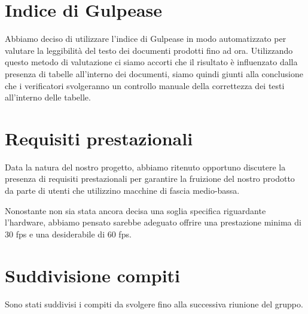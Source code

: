 \section{Indice di Gulpease}
Abbiamo deciso di utilizzare l'indice di Gulpease in modo automatizzato per valutare la leggibilità del testo dei documenti prodotti fino ad ora. \tabularnewline
Utilizzando questo metodo di valutazione ci siamo accorti che il risultato è influenzato dalla presenza di tabelle all'interno dei documenti, siamo quindi giunti alla conclusione che i verificatori svolgeranno un controllo manuale della correttezza dei testi all'interno delle tabelle.

\section{Requisiti prestazionali}
Data la natura del nostro progetto, abbiamo ritenuto opportuno discutere la presenza di requisiti prestazionali per garantire la fruizione del nostro prodotto da parte di utenti che utilizzino macchine di fascia medio-bassa. \tabularnewline

Nonostante non sia stata ancora decisa una soglia specifica riguardante l'hardware, abbiamo pensato sarebbe adeguato offrire una prestazione minima di 30 fps e una desiderabile di 60 fps.

\section{Suddivisione compiti}
Sono stati suddivisi i compiti da svolgere fino alla successiva riunione del gruppo.
